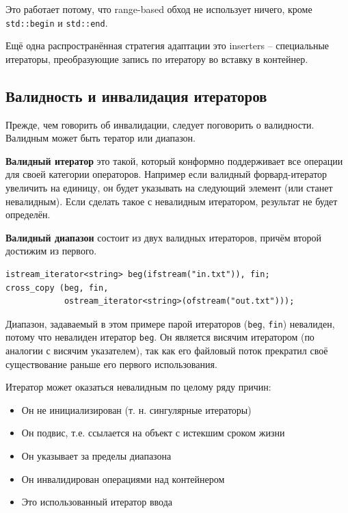 \documentclass[a4paper,12pt,oneside]{book}
\begin{document}
Это работает потому, что range-based обход не использует ничего, кроме \lstinline!std::begin! и \lstinline!std::end!.

Ещё одна распространённая стратегия адаптации это inserters -- специальные итераторы, преобразующие запись по итератору во вставку в контейнер.

\subsection{Валидность и инвалидация итераторов}\label{subsub:valinval}

Прежде, чем говорить об инвалидации, следует поговорить о валидности. Валидным может быть тератор или диапазон.

\textbf{Валидный итератор} это такой, который конформно поддерживает все операции для своей категории операторов. Например если валидный форвард-итератор увеличить на единицу, он будет указывать на следующий элемент (или станет невалидным). Если сделать такое с невалидным итератором, результат не будет определён.

\textbf{Валидный диапазон} состоит из двух валидных итераторов, причём второй достижим из первого.

\begin{lstlisting}
istream_iterator<string> beg(ifstream("in.txt")), fin;
cross_copy (beg, fin,
            ostream_iterator<string>(ofstream("out.txt")));
\end{lstlisting}

Диапазон, задаваемый в этом примере парой итераторов (\lstinline!beg!, \lstinline!fin!) невалиден, потому что невалиден итератор \lstinline!beg!. Он является висячим итератором (по аналогии с висячим указателем), так как его файловый поток прекратил своё существование раньше его первого использования.

Итератор может оказаться невалидным по целому ряду причин:

\begin{itemize}
\item Он не инициализирован (т. н. сингулярные итераторы)
\item Он подвис, т.е. ссылается на объект с истекшим сроком жизни
\item Он указывает за пределы диапазона
\item Он инвалидирован операциями над контейнером
\item Это использованный итератор ввода
\end{itemize}
\end{document}
